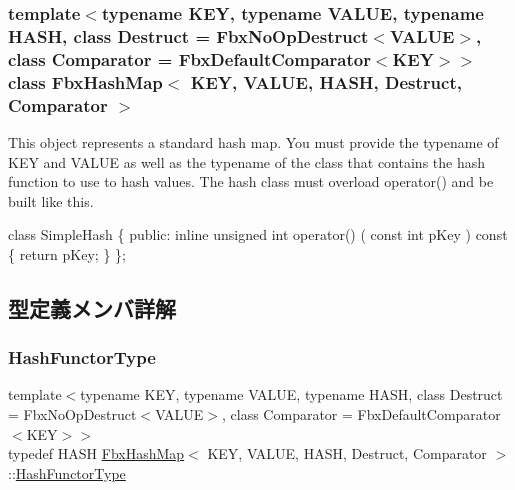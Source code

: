 \subsubsection*{template$<$typename K\+EY, typename V\+A\+L\+UE, typename H\+A\+SH, class Destruct = Fbx\+No\+Op\+Destruct$<$\+V\+A\+L\+U\+E$>$, class Comparator = Fbx\+Default\+Comparator$<$\+K\+E\+Y$>$$>$\newline
class Fbx\+Hash\+Map$<$ K\+E\+Y, V\+A\+L\+U\+E, H\+A\+S\+H, Destruct, Comparator $>$}

This object represents a standard hash map. You must provide the typename of K\+EY and V\+A\+L\+UE as well as the typename of the class that contains the hash function to use to hash values. The hash class must overload operator() and be built like this. 


\begin{DoxyCode}
\textcolor{keyword}{class }SimpleHash
\{
\textcolor{keyword}{public}:
    \textcolor{keyword}{inline} \textcolor{keywordtype}{unsigned} \textcolor{keywordtype}{int} operator() ( \textcolor{keyword}{const} \textcolor{keywordtype}{int} pKey )\textcolor{keyword}{ const}
\textcolor{keyword}{    }\{
        \textcolor{keywordflow}{return} pKey;
    \}
\};
\end{DoxyCode}
 

\subsection{型定義メンバ詳解}
\mbox{\label{class_fbx_hash_map_a254381e9c4bde567aaf9d7286d753bd7}} 
\subsubsection{\texorpdfstring{Hash\+Functor\+Type}{HashFunctorType}}
{\footnotesize\ttfamily template$<$typename K\+EY, typename V\+A\+L\+UE, typename H\+A\+SH, class Destruct = Fbx\+No\+Op\+Destruct$<$\+V\+A\+L\+U\+E$>$, class Comparator = Fbx\+Default\+Comparator$<$\+K\+E\+Y$>$$>$ \\
typedef H\+A\+SH \hyperlink{class_fbx_hash_map}{Fbx\+Hash\+Map}$<$ K\+EY, V\+A\+L\+UE, H\+A\+SH, Destruct, Comparator $>$\+::\hyperlink{class_fbx_hash_map_a254381e9c4bde567aaf9d7286d753bd7}{Hash\+Functor\+Type}}

\mbox{\label{class_fbx_hash_map_ab56799173b6c58b676a94370b64ddbb0}} 
